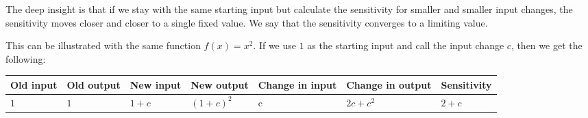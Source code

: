 \documentclass{math-deane}
\begin{document}
The deep insight is that if we stay with the same starting input but calculate the sensitivity for smaller and smaller input changes, the sensitivity moves closer and closer to a single fixed value. We say that the sensitivity converges to a limiting value.

This can be illustrated with the same function $f(x)=x^2$. If we use $1$ as the starting input and call the input change $c$, then we get the following:

\begin{tabular}{|p{0.75in}|p{0.75in}|p{0.75in}|p{0.75in}|p{0.75in}|p{1in}|p{1in}|}
\hline
Old input&Old output&New input& New output & Change in input &
Change in output & Sensitivity \\ \hline
$1$ & $1$ & $1+c$ & $(1+c)^2$ & c & $2c+c^2$ & $2+c$ \\ \hline
\end{tabular}
\end{document}
